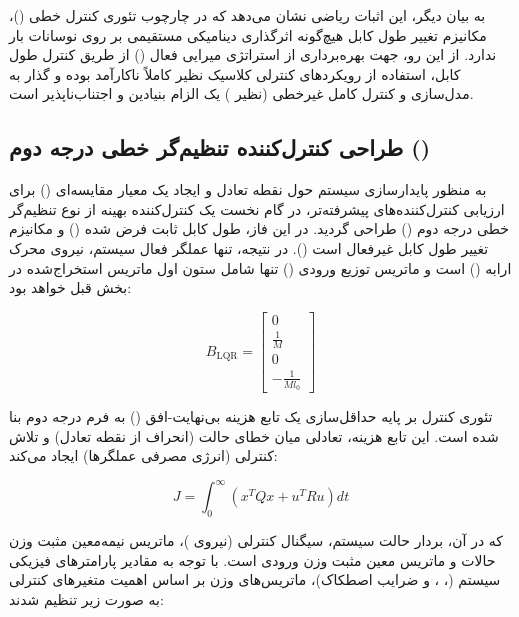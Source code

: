 به بیان دیگر، این اثبات ریاضی نشان می‌دهد که در چارچوب تئوری کنترل خطی ()، مکانیزم تغییر طول کابل هیچ‌گونه اثرگذاری دینامیکی مستقیمی بر روی نوسانات بار ندارد. از این رو، جهت بهره‌برداری از استراتژی میرایی فعال () از طریق کنترل طول کابل، استفاده از رویکردهای کنترلی کلاسیک نظیر  کاملاً ناکارآمد بوده و گذار به مدل‌سازی و کنترل کامل غیرخطی (نظیر ) یک الزام بنیادین و اجتناب‌ناپذیر است.

\subsection{طراحی کنترل‌کننده تنظیم‌گر خطی درجه دوم ()}

به منظور پایدارسازی سیستم حول نقطه تعادل و ایجاد یک معیار مقایسه‌ای () برای ارزیابی کنترل‌کننده‌های پیشرفته‌تر، در گام نخست یک کنترل‌کننده بهینه از نوع تنظیم‌گر خطی درجه دوم () طراحی گردید. در این فاز، طول کابل ثابت فرض شده () و مکانیزم تغییر طول کابل غیرفعال است (). در نتیجه، تنها عملگر فعال سیستم، نیروی محرک ارابه () است و ماتریس توزیع ورودی () تنها شامل ستون اول ماتریس  استخراج‌شده در بخش قبل خواهد بود:

\begin{equation}
    \renewcommand{\arraystretch}{1.8}
    B_{\mathrm{LQR}} = \begin{bmatrix} 0 \\ \frac{1}{M} \\ 0 \\ -\frac{1}{M l_0} \end{bmatrix}
\end{equation}

تئوری کنترل  بر پایه حداقل‌سازی یک تابع هزینه بی‌نهایت-افق () به فرم درجه دوم بنا شده است. این تابع هزینه، تعادلی میان خطای حالت (انحراف از نقطه تعادل) و تلاش کنترلی (انرژی مصرفی عملگرها) ایجاد می‌کند:

\begin{equation}
    J = \int_{0}^{\infty} \left( x^T Q x + u^T R u \right) dt
\end{equation}

که در آن،  بردار حالت سیستم،  سیگنال کنترلی (نیروی )،  ماتریس نیمه‌معین مثبت وزن حالات و  ماتریس معین مثبت وزن ورودی است. با توجه به مقادیر پارامترهای فیزیکی سیستم (، ،  و ضرایب اصطکاک)، ماتریس‌های وزن بر اساس اهمیت متغیرهای کنترلی به صورت زیر تنظیم شدند:

